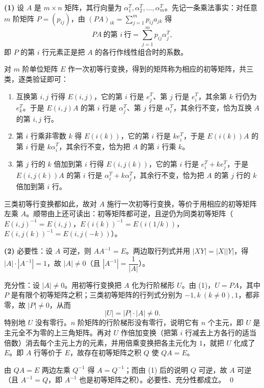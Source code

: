 \begin{solution}
\textbf{(1)} 设 $A$ 是 $m\times n$ 矩阵，其行向量为 $\alpha_1^{T},\alpha_2^{T},\dots,\alpha_m^{T}$。先记一条乘法事实：对任意 $m$ 阶矩阵 $P=(p_{ij})$，由 $(PA)_{ik}=\sum_{j=1}^{m}p_{ij}a_{jk}$ 得
\[
PA\ \text{的第 } i\ \text{行}=\sum_{j=1}^{m}p_{ij}\alpha_j^{T},
\]
即 $P$ 的第 $i$ 行元素正是把 $A$ 的各行作线性组合时的系数。

对 $m$ 阶单位矩阵 $E$ 作一次初等行变换，得到的矩阵称为相应的初等矩阵，共三类，逐类验证即可：
\begin{enumerate}[label=(\roman*),leftmargin=2.4em,itemsep=0.2em,topsep=0.25em]
  \item 互换第 $i,j$ 行得 $E(i,j)$，它的第 $i$ 行是 $e_j^{T}$、第 $j$ 行是 $e_i^{T}$，其余第 $k$ 行仍为 $e_k^{T}$。于是 $E(i,j)A$ 的第 $i$ 行是 $\alpha_j^{T}$、第 $j$ 行是 $\alpha_i^{T}$，其余行不变，恰为互换 $A$ 的第 $i,j$ 行。
  \item 第 $i$ 行乘非零数 $k$ 得 $E(i(k))$，它的第 $i$ 行是 $ke_i^{T}$，于是 $E(i(k))A$ 的第 $i$ 行是 $k\alpha_i^{T}$，其余行不变，恰为把 $A$ 的第 $i$ 行乘 $k$。
  \item 第 $j$ 行的 $k$ 倍加到第 $i$ 行得 $E(i,j(k))$，它的第 $i$ 行是 $e_i^{T}+ke_j^{T}$，于是 $E(i,j(k))A$ 的第 $i$ 行是 $\alpha_i^{T}+k\alpha_j^{T}$，其余行不变，恰为把 $A$ 的第 $j$ 行的 $k$ 倍加到第 $i$ 行。
\end{enumerate}
三类初等行变换都如此，故对 $A$ 施行一次初等行变换，等价于用相应的初等矩阵左乘 $A$。顺带由上还可读出：初等矩阵都可逆，且逆仍为同类初等矩阵（$E(i,j)^{-1}=E(i,j)$，$E(i(k))^{-1}=E(i(1/k))$，$E(i,j(k))^{-1}=E(i,j(-k))$）。

\textbf{(2)} 必要性：设 $A$ 可逆，则 $AA^{-1}=E$。两边取行列式并用 $|XY|=|X||Y|$，得 $|A|\cdot|A^{-1}|=1$，故 $|A|\ne0$（且 $|A^{-1}|=\dfrac{1}{|A|}$）。

充分性：设 $|A|\ne0$。用初等行变换把 $A$ 化为行阶梯形 $U$。由 (1)，$U=PA$，其中 $P$ 是有限个初等矩阵之积；三类初等矩阵的行列式分别为 $-1,k\ (k\ne0),1$，都非零，故 $|P|\ne0$，从而
\[
|U|=|P|\cdot|A|\ne0 .
\]
特别地 $U$ 没有零行。$n$ 阶矩阵的行阶梯形没有零行，说明它有 $n$ 个主元，即 $U$ 是主元全不为零的上三角矩阵。再对 $U$ 作倍加变换（把第 $i$ 行减去上方各行的适当倍数）消去每个主元上方的元素，并用倍乘变换把各主元化为 $1$，就把 $U$ 化成了 $E$。即 $A$ 行等价于 $E$，故存在初等矩阵之积 $Q$ 使 $QA=E$。

由 $QA=E$ 两边左乘 $Q^{-1}$ 得 $A=Q^{-1}$；而由 (1) 后的说明 $Q$ 可逆，故 $A$ 可逆（且 $A^{-1}=Q$，即 $A^{-1}$ 也是初等矩阵之积）。必要性、充分性都成立。
\qed
\end{solution}
